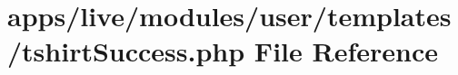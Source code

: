 \hypertarget{live_2modules_2user_2templates_2tshirt_success_8php}{\section{apps/live/modules/user/templates/tshirt\-Success.php File Reference}
\label{live_2modules_2user_2templates_2tshirt_success_8php}
}
